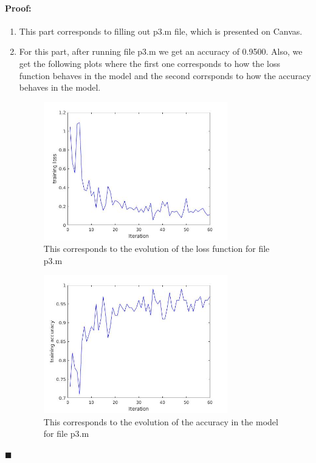 \documentclass[12pt]{article}
\newenvironment{proof}{\paragraph{Proof: }}{\hfill$\blacksquare$}
\begin{document}
\begin{proof}

\begin{enumerate}

\item This part corresponds to filling out p3.m file, which is presented on Canvas.

\item For this part, after running file p3.m we get an accuracy of 0.9500. Also, we get the following plots where the first one corresponds to how the loss function behaves in the model and the second corrsponds to how the accuracy behaves in the model.

\begin{figure}[!htbp]
\centering
\includegraphics[width=8cm]{loss_p3.jpg}
\caption{This corresponds to the evolution of the loss function for file p3.m}
\end{figure}

\begin{figure}[!htbp]
\centering
\includegraphics[width=8cm]{accuracy_p3.jpg}
\caption{This corresponds to the evolution of the accuracy in the model for file p3.m}
\end{figure}


\end{enumerate}
\end{proof}
\end{document}
